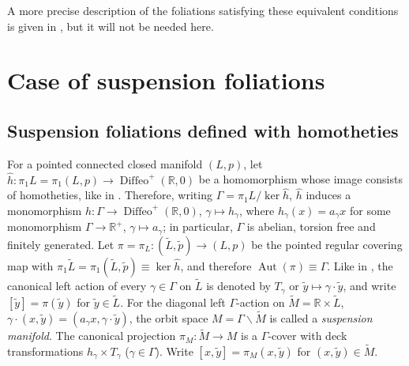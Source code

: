 \documentclass{memo-l}
\theoremstyle{plain}
\theoremstyle{definition}
\theoremstyle{remark}
\newcommand{\R}{\mathbb{R}}
\newcommand{\FF}{\mathcal{F}}
\newcommand{\Aut}{\operatorname{Aut}}
\newcommand{\Diffeo}{\operatorname{Diffeo}}
\numberwithin{section}{chapter}
\numberwithin{equation}{section}%
\begin{document}
A more precise description of the foliations satisfying these equivalent conditions is given in \cite[Theorem~6.9]{AlvKordyLeichtnam2022}, but it will not be needed here.%




\section{Case of suspension foliations}\label{s: suspension}

\subsection{Suspension foliations defined with homotheties}\label{ss: suspension - homotheties}

For a pointed connected closed manifold $(L,p)$, let $\hat h:\pi_1L=\pi_1(L,p)\to\Diffeo^+(\R,0)$ be a homomorphism whose image consists of homotheties, like in . Therefore, writing $\Gamma=\pi_1L/\ker\hat h$, $\hat h$ induces a monomorphism $h:\Gamma\to\Diffeo^+(\R,0)$, $\gamma\mapsto h_\gamma$, where $h_\gamma(x)=a_\gamma x$ for some monomorphism $\Gamma\to\R^+$, $\gamma\mapsto a_\gamma$; in particular, $\Gamma$ is abelian, torsion free and finitely generated. Let $\pi=\pi_L:(\widetilde L,\tilde p)\to(L,p)$ be the pointed regular covering map with $\pi_1\widetilde L=\pi_1(\widetilde L,\tilde p)\equiv\ker\hat h$, and therefore $\Aut(\pi)\equiv\Gamma$. Like in , the canonical left action of every $\gamma\in\Gamma$ on $\widetilde L$ is denoted by $T_\gamma$ or $\tilde y\mapsto\gamma\cdot\tilde y$, and write $[\tilde y]=\pi(\tilde y)$ for $\tilde y\in\widetilde L$. For the diagonal left $\Gamma$-action on $\widetilde M=\R\times\widetilde L$, $\gamma\cdot(x,\tilde y)=(a_\gamma x,\gamma\cdot\tilde y)$, the orbit space $M=\Gamma\backslash\widetilde M$ is called a \emph{suspension manifold}. The canonical projection $\pi_M:\widetilde M\to M$ is a $\Gamma$-cover with deck transformations $h_\gamma\times T_\gamma$ ($\gamma\in\Gamma$). Write $[x,\tilde y]=\pi_M(x,\tilde y)$ for $(x,\tilde y)\in\widetilde M$. 
\end{document}
